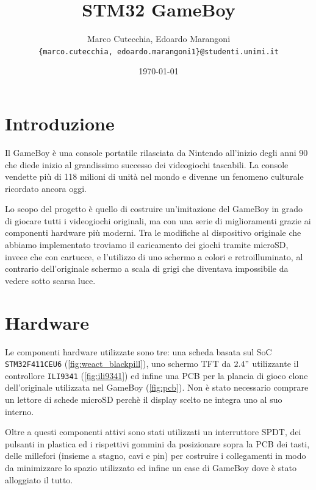 \documentclass[hidelinks,12pt]{article}
\title{STM32 GameBoy}
\date{\today}
\author{Marco Cutecchia, Edoardo Marangoni \\
\footnotesize \texttt{\{marco.cutecchia, edoardo.marangoni1\}@studenti.unimi.it} \\ }
\begin{document}
\maketitle

\section{Introduzione}
Il GameBoy è una console portatile rilasciata da Nintendo all'inizio degli anni
90 che diede inizio al grandissimo successo dei videogiochi tascabili.
La console vendette più di 118 milioni di unità nel mondo e divenne un fenomeno
culturale ricordato ancora oggi.

Lo scopo del progetto è quello di costruire un'imitazione del GameBoy in grado
di giocare tutti i videogiochi originali, ma con una serie di miglioramenti
grazie ai componenti hardware più moderni. Tra le modifiche al dispositivo
originale che abbiamo implementato troviamo il caricamento dei giochi tramite
microSD, invece che con cartucce, e l'utilizzo di uno schermo a colori e
retroilluminato, al contrario dell'originale schermo a scala di grigi che
diventava impossibile da vedere sotto scarsa luce.

\section{Hardware}
Le componenti hardware utilizzate sono tre: una scheda basata sul
SoC \texttt{STM32F411CEU6} (\cref{fig:weact_blackpill}),
uno schermo TFT da $2.4"$ utilizzante il controllore \texttt{ILI9341}
(\cref{fig:ili9341}) ed infine una PCB per la plancia di gioco clone
dell'originale utilizzata nel GameBoy (\cref{fig:pcb}).
Non è stato necessario comprare un lettore di schede microSD perchè il
display scelto ne integra uno al suo interno.

Oltre a questi componenti attivi sono stati utilizzati un interruttore SPDT,
dei pulsanti in plastica ed i rispettivi gommini da posizionare sopra la PCB
dei tasti, delle millefori (insieme a stagno, cavi e pin) per costruire i
collegamenti in modo da minimizzare lo spazio utilizzato ed infine un case di
GameBoy dove è stato alloggiato il tutto.
\end{document}
